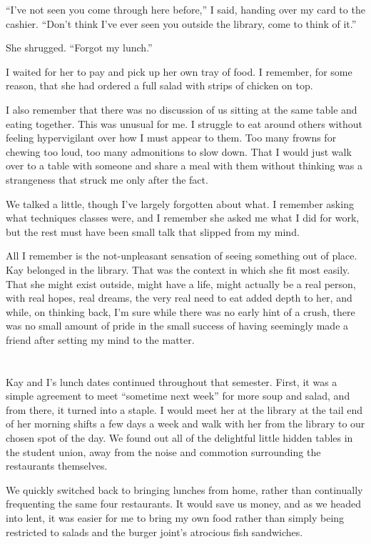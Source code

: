 ``I've not seen you come through here before,'' I said, handing over my card to the cashier. ``Don't think I've ever seen you outside the library, come to think of it.''

She shrugged. ``Forgot my lunch.''

I waited for her to pay and pick up her own tray of food. I remember, for some reason, that she had ordered a full salad with strips of chicken on top.

I also remember that there was no discussion of us sitting at the same table and eating together. This was unusual for me. I struggle to eat around others without feeling hypervigilant over how I must appear to them. Too many frowns for chewing too loud, too many admonitions to slow down. That I would just walk over to a table with someone and share a meal with them without thinking was a strangeness that struck me only after the fact.

We talked a little, though I've largely forgotten about what. I remember asking what techniques classes were, and I remember she asked me what I did for work, but the rest must have been small talk that slipped from my mind.

All I remember is the not-unpleasant sensation of seeing something out of place. Kay belonged in the library. That was the context in which she fit most easily. That she might exist outside, might have a life, might actually be a real person, with real hopes, real dreams, the very real need to eat added depth to her, and while, on thinking back, I'm sure while there was no early hint of a crush, there was no small amount of pride in the small success of having seemingly made a friend after setting my mind to the matter.

\section{}

Kay and I's lunch dates continued throughout that semester. First, it was a simple agreement to meet ``sometime next week'' for more soup and salad, and from there, it turned into a staple. I would meet her at the library at the tail end of her morning shifts a few days a week and walk with her from the library to our chosen spot of the day. We found out all of the delightful little hidden tables in the student union, away from the noise and commotion surrounding the restaurants themselves.

We quickly switched back to bringing lunches from home, rather than continually frequenting the same four restaurants. It would save us money, and as we headed into lent, it was easier for me to bring my own food rather than simply being restricted to salads and the burger joint's atrocious fish sandwiches.

